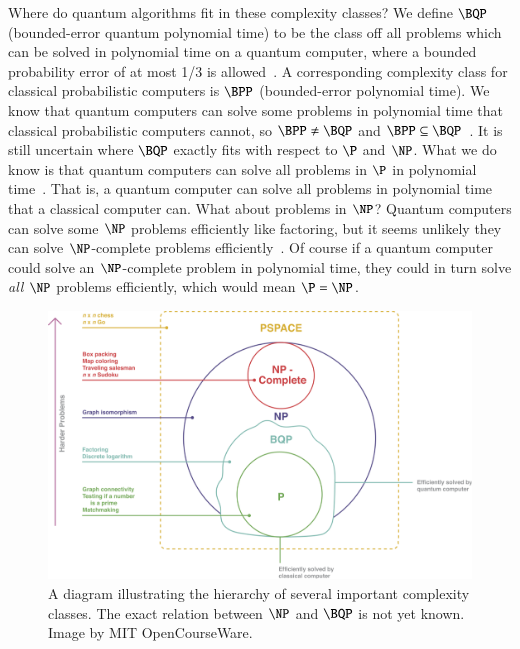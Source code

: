 \documentclass[twocolumn, switch]{article}
\begin{document}
    Where do quantum algorithms fit in these complexity classes?
    We define $\BQP$ (bounded-error quantum polynomial time) to be the class off all problems which can be solved in polynomial time on a quantum computer, where a bounded probability error of at most 1/3 is allowed~\cite{nielsen-chuang}.
    A corresponding complexity class for classical probabilistic computers is $\BPP$ (bounded-error polynomial time).
    We know that quantum computers can solve some problems in polynomial time that classical probabilistic computers cannot, so $\BPP \neq \BQP$ and $\BPP \subseteq \BQP$~\cite{bernstein1997quantum}.
    It is still uncertain where $\BQP$ exactly fits with respect to $\P$ and $\NP$.
    What we do know is that quantum computers can solve all problems in $\P$ in polynomial time~\cite{bennett1973logical}.
    That is, a quantum computer can solve all problems in polynomial time that a classical computer can.
    What about problems in $\NP$?
    Quantum computers can solve some $\NP$ problems efficiently like factoring, but it seems unlikely they can solve $\NP$-complete problems efficiently~\cite{aaronson2010bqp}.
    Of course if a quantum computer could solve an $\NP$-complete problem in polynomial time, they could in turn solve \emph{all} $\NP$ problems efficiently, which would mean $\P = \NP$.
    
    \begin{figure}[ht]
        \centering
        \includegraphics[width=.9\linewidth]{figures/complexity_hierarchy.pdf}
        \caption{A diagram illustrating the hierarchy of several important complexity classes. The exact relation between $\NP$ and $\BQP$ is not yet known. Image by MIT OpenCourseWare.}
    \end{figure}
\end{document}
